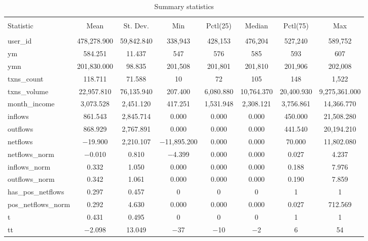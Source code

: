 
\begin{table}[!htbp] \centering 
  \caption{Summary statistics} 
  \label{tab:sumstats} 
\tiny 
\begin{tabular}{@{\extracolsep{5pt}}lccccccc} 
\\[-1.8ex]\hline 
\hline \\[-1.8ex] 
Statistic & \multicolumn{1}{c}{Mean} & \multicolumn{1}{c}{St. Dev.} & \multicolumn{1}{c}{Min} & \multicolumn{1}{c}{Pctl(25)} & \multicolumn{1}{c}{Median} & \multicolumn{1}{c}{Pctl(75)} & \multicolumn{1}{c}{Max} \\ 
\hline \\[-1.8ex] 
user\_id & 478,278.900 & 59,842.840 & 338,943 & 428,153 & 476,204 & 527,240 & 589,752 \\ 
ym & 584.251 & 11.437 & 547 & 576 & 585 & 593 & 607 \\ 
ymn & 201,830.000 & 98.835 & 201,508 & 201,801 & 201,810 & 201,906 & 202,008 \\ 
txns\_count & 118.711 & 71.588 & 10 & 72 & 105 & 148 & 1,522 \\ 
txns\_volume & 22,957.810 & 76,135.940 & 207.400 & 6,080.880 & 10,764.370 & 20,400.930 & 9,275,361.000 \\ 
month\_income & 3,073.528 & 2,451.120 & 417.251 & 1,531.948 & 2,308.121 & 3,756.861 & 14,366.770 \\ 
inflows & 861.543 & 2,845.714 & 0.000 & 0.000 & 0.000 & 450.000 & 21,508.280 \\ 
outflows & 868.929 & 2,767.891 & 0.000 & 0.000 & 0.000 & 441.540 & 20,194.210 \\ 
netflows & $-$19.900 & 2,210.107 & $-$11,895.200 & 0.000 & 0.000 & 70.000 & 11,802.080 \\ 
netflows\_norm & $-$0.010 & 0.810 & $-$4.399 & 0.000 & 0.000 & 0.027 & 4.237 \\ 
inflows\_norm & 0.332 & 1.050 & 0.000 & 0.000 & 0.000 & 0.188 & 7.976 \\ 
outflows\_norm & 0.342 & 1.061 & 0.000 & 0.000 & 0.000 & 0.190 & 7.859 \\ 
has\_pos\_netflows & 0.297 & 0.457 & 0 & 0 & 0 & 1 & 1 \\ 
pos\_netflows\_norm & 0.292 & 4.630 & 0.000 & 0.000 & 0.000 & 0.027 & 712.569 \\ 
t & 0.431 & 0.495 & 0 & 0 & 0 & 1 & 1 \\ 
tt & $-$2.098 & 13.049 & $-$37 & $-$10 & $-$2 & 6 & 54 \\ 

\end{tabular}
\end{table}
